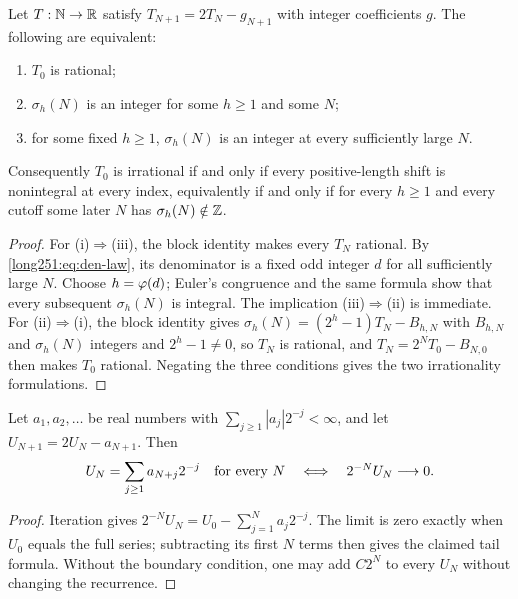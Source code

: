 \documentclass[11pt]{article}
\makeatletter
\newcommand{\compatlabel}[1]{\ltx@label{#1}}
\makeatother
\begin{document}
\begin{theorem}\label{long251:res:escape-irrational}\compatlabel{res:collapse}
Let $T:\mathbb{N}\to\mathbb{R}$ satisfy $T_{N+1}=2T_N-g_{N+1}$ with integer coefficients $g$.  The
following are equivalent:
\begin{enumerate}[label=\textup{(\roman*)}]
\item $T_0$ is rational;
\item $\sigma_h(N)$ is an integer for some $h\ge1$ and some $N$;
\item for some fixed $h\ge1$, $\sigma_h(N)$ is an integer at every
  sufficiently large $N$.
\end{enumerate}
Consequently $T_0$ is irrational if and only if every positive-length shift is
nonintegral at every index, equivalently if and only if for every $h\ge1$ and
every cutoff some later $N$ has $\sigma_h(N)\notin\mathbb{Z}$.
\end{theorem}

\begin{proof}
For \textup{(i)}$\Rightarrow$\textup{(iii)}, the block identity makes every
$T_N$ rational.  By \eqref{long251:eq:den-law}, its denominator is a fixed
odd integer $d$ for all sufficiently large $N$.  Choose $h=\varphi(d)$;
Euler's congruence and the same formula show that every subsequent
$\sigma_h(N)$ is integral.  The implication
\textup{(iii)}$\Rightarrow$\textup{(ii)} is immediate.  For
\textup{(ii)}$\Rightarrow$\textup{(i)}, the block identity gives
$\sigma_h(N)=(2^h-1)T_N-B_{h,N}$ with $B_{h,N}$ and $\sigma_h(N)$ integers and
$2^h-1\ne0$, so $T_N$ is rational, and $T_N=2^NT_0-B_{N,0}$ then makes $T_0$
rational.  Negating the three conditions gives the two irrationality
formulations.
\end{proof}

\begin{lemma}\label{long251:res:true-tail}
Let $a_1,a_2,\ldots$ be real numbers with
$\sum_{j\ge1}|a_j|2^{-j}<\infty$, and let $U_{N+1}=2U_N-a_{N+1}$.
Then
\[
 U_N=\sum_{j\ge1}a_{N+j}2^{-j}\quad\hbox{for every }N
 \quad\Longleftrightarrow\quad 2^{-N}U_N\longrightarrow0.
\]
\end{lemma}
\begin{proof}
Iteration gives
$2^{-N}U_N=U_0-\sum_{j=1}^{N}a_j2^{-j}$.
The limit is zero exactly when $U_0$ equals the full series; subtracting
its first $N$ terms then gives the claimed tail formula.  Without the boundary condition,
one may add $C2^N$ to every $U_N$ without changing the recurrence.
\end{proof}
\end{document}
